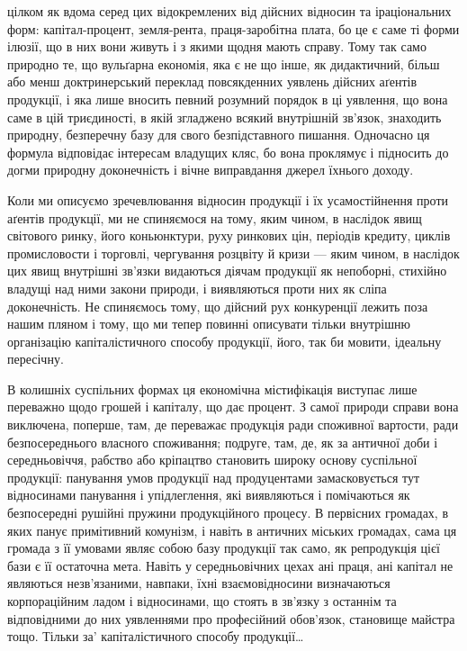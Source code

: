 \parcont{}  %
цілком як вдома серед цих відокремлених від дійсних відносин та іраціональних
форм: капітал-процент, земля-рента, праця-заробітна плата, бо це є саме ті
форми ілюзії, що в них вони живуть і з якими щодня мають справу. Тому
так само природно те, що вульґарна економія, яка є не що інше, як дидактичний,
більш або менш доктринерський переклад повсякденних уявлень дійсних аґентів
продукції, і яка лише вносить певний розумний порядок в ці уявлення, що вона
саме в цій триєдиності, в якій згладжено всякий внутрішній зв’язок, знаходить
природну, безперечну базу для свого безпідставного пишання. Одночасно ця
формула відповідає інтересам владущих кляс, бо вона проклямує і підносить
до догми природну доконечність і вічне виправдання джерел їхнього доходу.

Коли ми описуємо зречевлювання відносин продукції і їх усамостійнення
проти аґентів продукції, ми не спиняємося на тому, яким чином, в наслідок
явищ світового ринку, його коньюнктури, руху ринкових цін, періодів кредиту,
циклів промисловости і торговлі, чергування розцвіту й кризи — яким чином,
в наслідок цих явищ внутрішні зв’язки видаються діячам продукції як непоборні,
стихійно владущі над ними закони природи, і виявляються проти них як сліпа
доконечність. Не спиняємось тому, що дійсний рух конкуренції лежить поза
нашим пляном і тому, що ми тепер повинні описувати тільки внутрішню
організацію капіталістичного способу продукції, його, так би мовити, ідеальну
пересічну.

В колишніх суспільних формах ця економічна містифікація виступає лише
переважно щодо грошей і капіталу, що дає процент. З самої природи справи
вона виключена, поперше, там, де переважає продукція ради споживної вартости,
ради безпосереднього власного споживання; подруге, там, де, як за античної доби
і середньовіччя, рабство або кріпацтво становить широку основу суспільної продукції:
панування умов продукції над продуцентами замасковується тут відносинами
панування і упідлеглення, які виявляються і помічаються як безпосередні
рушійні пружини продукційного процесу. В первісних громадах, в яких
панує примітивний комунізм, і навіть в античних міських громадах, сама ця
громада з її умовами являє собою базу продукції так само, як репродукція цієї
бази є її остаточна мета. Навіть у середньовічних цехах ані праця, ані капітал
не являються незв’язаними, навпаки, їхні взаємовідносини визначаються корпораційним
ладом і відносинами, що стоять в зв’язку з останнім та відповідними
до них уявленнями про професійний обов’язок, становище майстра тощо.
Тільки за' капіталістичного способу продукції\dots{}

